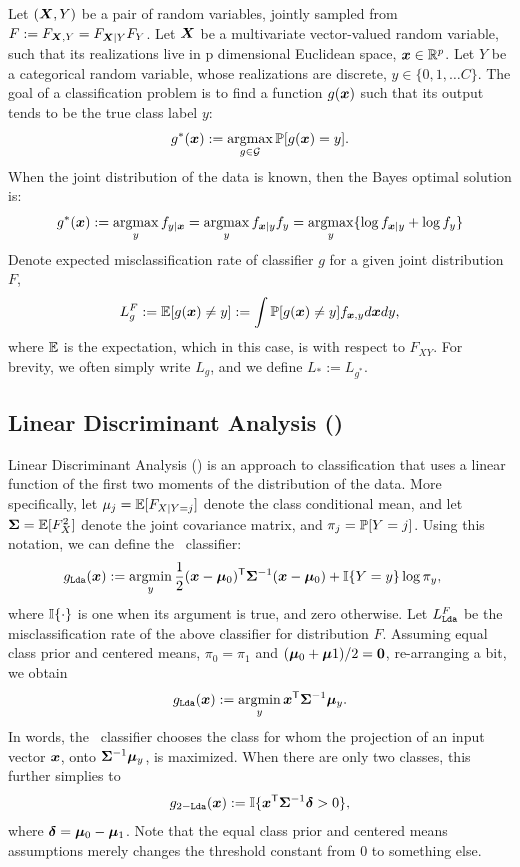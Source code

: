 \documentclass[10pt]{article}
\begin{document}
Let $(\boldsymbol{X},Y)$ be a pair of random variables, jointly sampled from $F :=F_{\boldsymbol{X},Y}=F_{\boldsymbol{X}|Y}F_{Y}$.
Let $\boldsymbol{X}$ be a multivariate vector-valued random variable, such that its realizations live in p dimensional Euclidean space, $\boldsymbol{x} \in \mathbb{R}^p$.  Let $Y$ be a categorical random variable, whose realizations are discrete,  $y \in \{0,1,\ldots C\}$.  The goal of a classification problem is to find a function $g(\boldsymbol{x})$ such that its output tends to be the true class label $y$:
\begin{align*} %
g^*(\bx) := \argmax_{g \in \mc{G}} \PP[g(\bx) = y].
\end{align*}
When the joint distribution of the data is known, then the Bayes optimal solution is:
\begin{align}  \label{eq:R}
g^*(\bx) := \argmax_y f_{y|\bx} = \argmax_y f_{\bx|y}f_y =\argmax_y \{\log f_{\bx|y} + \log f_y \}
\end{align}
Denote expected misclassification rate of classifier $g$ for a given joint distribution $F$,
\begin{align*}
L^F_g := \mathbb{E}[g(\boldsymbol{x}) \neq y] := \int \mathbb{P}[g(\boldsymbol{x}) \neq y] f_{\boldsymbol{x},y} d\boldsymbol{x} dy,
\end{align*}
where $\mathbb{E}$ is the expectation, which in this case, is with respect to $F_{XY}$.
For brevity, we often simply write $L_g$, and we define $L_* := L_{g^*}$.


\subsection{Linear Discriminant Analysis (\Lda)}

Linear Discriminant Analysis (\Lda) is an approach to classification that uses a linear function of the first two moments of the distribution of the data.  More specifically, let $\mu_j=\mathbb{E}[F_{X|Y=j}]$ denote the class conditional mean, and let $\boldsymbol{\Sigma}=\mathbb{E}[F_{X}^2]$ denote the joint covariance matrix, and $\pi_j=\mathbb{P}[Y=j]$.   Using this notation, we can define the \Lda~classifier:
\begin{align*}
g_{\Lda}(\bx)&:=\argmin_y \frac{1}{2} (\bx-\bmu_0)\T \bSig^{-1}(\bx-\bmu_0) + \II\{Y=y\}  \log \pi_y,
\end{align*}
where $\mathbb{I}\{ \cdot\}$ is one when its argument is true, and zero otherwise.
Let $L_{{\sc \texttt{Lda}}}^F$ be the misclassification rate of the above classifier for distribution $F$.
%
Assuming equal class prior and centered means,  $\pi_0=\pi_1$ and $(\boldsymbol{\mu}_0+\boldsymbol{\mu}1)/2=\boldsymbol{0}$, re-arranging a bit, we obtain
\begin{align*}
g_{\Lda}(\bx) :=  \argmin_y \bx\T \bSig^{-1} \bmu_y.
\end{align*}
In words, the  \Lda~classifier chooses the class for whom the projection of an input vector $\boldsymbol{x}$, onto $\boldsymbol{\Sigma}^{-1} \boldsymbol{\mu}_y$, is maximized.
%
When there are only two classes, this further simplies to
\begin{align*}
g_{2-{\sc \texttt{Lda}}}(\boldsymbol{x}) :=  \mathbb{I}\{ \boldsymbol{x}^{\mathsf{T}} \boldsymbol{\Sigma}^{-1} \boldsymbol{\delta} > 0 \},
\end{align*}
where $\boldsymbol{\delta}=\boldsymbol{\mu}_0-\boldsymbol{\mu}_1$.   Note that the equal class prior and centered means assumptions merely changes the threshold constant from $0$ to something else.
\end{document}
